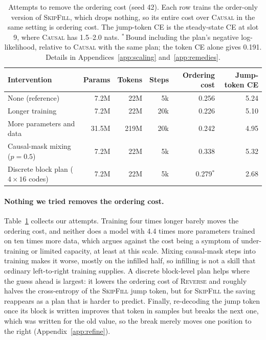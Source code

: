 \documentclass{article}
\theoremstyle{definition}
\theoremstyle{remark}
\newcommand{\name}[1]{\textup{\textsc{#1}}}
\newcommand{\sfill}{\name{SkipFill}\xspace}
\newcommand{\rev}{\name{Reverse}\xspace}
\newcommand{\causal}{\name{Causal}\xspace}
\begin{document}
\begin{table}[t]
  \centering
  \caption{Attempts to remove the ordering cost (seed 42). Each row trains the order-only version of \sfill, which drops nothing, so its entire cost over \causal in the same setting is ordering cost. The jump-token CE is the steady-state CE at slot 9, where \causal has 1.5--2.0 nats. $^\ast$\,Bound including the plan's negative log-likelihood, relative to \causal with the same plan; the token CE alone gives 0.191. Details in Appendices~\ref{app:scaling} and~\ref{app:remedies}.}
  \label{tab:attempts}
  \small
  \begin{tabular}{lrrrrr}
    \toprule
    Intervention & Params & Tokens & Steps & Ordering cost & Jump-token CE \\
    \midrule
    None (reference)                        & 7.2M  & 22M  & 5k  & 0.256 & 5.24 \\
    Longer training                         & 7.2M  & 22M  & 20k & 0.226 & 5.10 \\
    More parameters and data                & 31.5M & 219M & 20k & 0.242 & 4.95 \\
    Causal-mask mixing ($p=0.5$)            & 7.2M  & 22M  & 5k  & 0.338 & 5.32 \\
    Discrete block plan ($4\times16$ codes) & 7.2M  & 22M  & 5k  & 0.279$^\ast$ & 2.68 \\
    \bottomrule
  \end{tabular}
\end{table}

\paragraph{Nothing we tried removes the ordering cost.}
Table~\ref{tab:attempts} collects our attempts.
Training four times longer barely moves the ordering cost, and neither does a model with 4.4 times more parameters trained on ten times more data, which argues against the cost being a symptom of under-training or limited capacity, at least at this scale.
Mixing causal-mask steps into training makes it worse, mostly on the infilled half, so infilling is not a skill that ordinary left-to-right training supplies.
A discrete block-level plan helps where the guess ahead is largest: it lowers the ordering cost of \rev and roughly halves the cross-entropy of the \sfill jump token, but for \sfill the saving reappears as a plan that is harder to predict.
Finally, re-decoding the jump token once its block is written improves that token in samples but breaks the next one, which was written for the old value, so the break merely moves one position to the right (Appendix~\ref{app:refine}).
\end{document}
